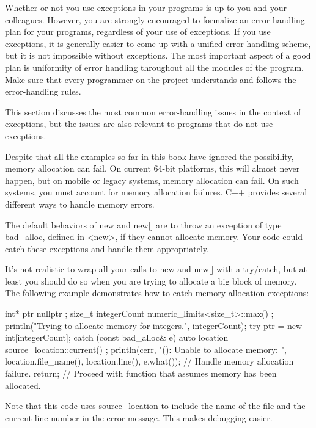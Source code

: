 
Whether or not you use exceptions in your programs is up to you and your colleagues. However, you are strongly encouraged to formalize an error-handling plan for your programs, regardless of your use of exceptions. If you use exceptions, it is generally easier to come up with a unified error-handling scheme, but it is not impossible without exceptions. The most important aspect of a good plan is uniformity of error handling throughout all the modules of the program. Make sure that every programmer on the project understands and follows the error-handling rules.

This section discusses the most common error-handling issues in the context of exceptions, but the issues are also relevant to programs that do not use exceptions.


Despite that all the examples so far in this book have ignored the possibility, memory allocation can fail. On current 64-bit platforms, this will almost never happen, but on mobile or legacy systems, memory allocation can fail. On such systems, you must account for memory allocation failures. C++ provides several different ways to handle memory errors.

The default behaviors of new and new[] are to throw an exception of type bad\_alloc, defined in <new>, if they cannot allocate memory. Your code could catch these exceptions and handle them appropriately.

It’s not realistic to wrap all your calls to new and new[] with a try/catch, but at least you should do so when you are trying to allocate a big block of memory. The following example demonstrates how to catch memory allocation exceptions:

\begin{cpp}
int* ptr { nullptr };
size_t integerCount { numeric_limits<size_t>::max() };
println("Trying to allocate memory for {} integers.", integerCount);
try {
    ptr = new int[integerCount];
} catch (const bad_alloc& e) {
    auto location { source_location::current() };
    println(cerr, "{}({}): Unable to allocate memory: {}",
        location.file_name(), location.line(), e.what());
    // Handle memory allocation failure.
    return;
}
// Proceed with function that assumes memory has been allocated.
\end{cpp}

Note that this code uses source\_location to include the name of the file and the current line number in the error message. This makes debugging easier.

